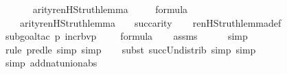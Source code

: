 \begin{isabellebody}
\ \ \ \ \isamarkupfalse%
\isanewline
{}\isamarkupfalse%
%
\endisatagproof
{\isafoldproof}%
%
\isadelimproof
\isanewline
%
\endisadelimproof
\isanewline
{}\isamarkupfalse%
\ arity{\isacharunderscore}{\kern0pt}ren{\isacharunderscore}{\kern0pt}HS{\isacharunderscore}{\kern0pt}truth{\isacharunderscore}{\kern0pt}lemma\ {\isacharcolon}{\kern0pt}\ \isanewline
\ \ \ {\isachardoublequoteopen}{\isasymphi}{\isasymin}formula{\isachardoublequoteclose}\isanewline
\ \ \ {\isachardoublequoteopen}arity{\isacharparenleft}{\kern0pt}ren{\isacharunderscore}{\kern0pt}HS{\isacharunderscore}{\kern0pt}truth{\isacharunderscore}{\kern0pt}lemma{\isacharparenleft}{\kern0pt}{\isasymphi}{\isacharparenright}{\kern0pt}{\isacharparenright}{\kern0pt}\ {\isasymle}\ {}\ {\isasymunion}\ succ{\isacharparenleft}{\kern0pt}arity{\isacharparenleft}{\kern0pt}{\isasymphi}{\isacharparenright}{\kern0pt}{\isacharparenright}{\kern0pt}{\isachardoublequoteclose}\isanewline
%
\isadelimproof
\isanewline
\ \ %
\endisadelimproof
%
\isatagproof
{}\isamarkupfalse%
\ ren{\isacharunderscore}{\kern0pt}HS{\isacharunderscore}{\kern0pt}truth{\isacharunderscore}{\kern0pt}lemma{\isacharunderscore}{\kern0pt}def\ \isanewline
\ \ \isamarkupfalse%
{\isacharparenleft}{\kern0pt}subgoal{\isacharunderscore}{\kern0pt}tac\ {\isachardoublequoteopen}{\isacharparenleft}{\kern0pt}{\isasymlambda}p{\isachardot}{\kern0pt}\ incr{\isacharunderscore}{\kern0pt}bv{\isacharparenleft}{\kern0pt}p{\isacharparenright}{\kern0pt}\ {\isacharbackquote}{\kern0pt}\ {}{\isacharparenright}{\kern0pt}{\isacharcircum}{\kern0pt}{}\ {\isacharparenleft}{\kern0pt}{\isasymphi}{\isacharparenright}{\kern0pt}\ {\isasymin}\ formula{\isachardoublequoteclose}{\isacharparenright}{\kern0pt}\isanewline
\ \ \isamarkupfalse%
\ assms\ \isanewline
\ \ \ \isamarkupfalse%
\ simp\isanewline
\ \ \ \isamarkupfalse%
{\isacharparenleft}{\kern0pt}rule\ pred{\isacharunderscore}{\kern0pt}le{\isacharcomma}{\kern0pt}\ simp{\isacharcomma}{\kern0pt}\ simp{\isacharparenright}{\kern0pt}{\isacharplus}{\kern0pt}\isanewline
\ \ \ \isamarkupfalse%
{\isacharparenleft}{\kern0pt}subst\ succ{\isacharunderscore}{\kern0pt}Un{\isacharunderscore}{\kern0pt}distrib{\isacharcomma}{\kern0pt}\ simp{\isacharcomma}{\kern0pt}\ simp{\isacharparenright}{\kern0pt}{\isacharplus}{\kern0pt}\isanewline
\ \ \ \isamarkupfalse%
{\isacharparenleft}{\kern0pt}simp\ add{\isacharcolon}{\kern0pt}nat{\isacharunderscore}{\kern0pt}union{\isacharunderscore}{\kern0pt}abs{}{\isacharparenright}{\kern0pt}\isanewline

\end{isabellebody}
